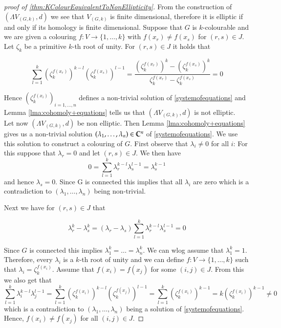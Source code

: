  
 \begin{proof}[proof of \ref{thm:KColourEquivalentToNonEllipticity}]
  From the construction of $(\Lambda V_{(G,k)},d)$ we see that  $V_{(G,k)}$ is finite dimensional, therefore
  it is elliptic if and only if its homology is finite dimensional. Suppose that $G$ is $k$-colourable and we are given a colouring
  $f \colon V \to { \lbrace 1, \dotsc , k \rbrace }$ with $f(x_r) \neq f(x_s)$ for $(r,s) \in J$. Let $\zeta_k$ be a primitive 
  $k$-th root of unity. For $(r,s) \in J$ it holds that
  
  $$ \sum_{l = 1}^k (\zeta_k^{f(x_r)})^{k-l} (\zeta_k^{f(x_s)})^{l-1}
  = \frac{(\zeta_k^{f(x_r)})^{k} - (\zeta_k^{f(x_s)})^{k}}{ \zeta_k^{f(x_r)} - \zeta_k^{f(x_s)}} = 0
  $$
  
  Hence $(\zeta_k^{f(x_i)})_{i = 1, \dotsc, n}$ defines a non-trivial solution of \ref{systemofequations}
  and Lemma \ref{lma:cohomoly+equations} tells us that $(\Lambda V_{(G,k)},d)$ is not elliptic. \\
  Let now $(\Lambda V_{(G,k)},d)$ be non elliptic. Then Lemma \ref{lma:cohomoly+equations} gives us a non-trivial
  solution $(\lambda_1 , \dotsc, \lambda_n) \in \mathbb{C}^n$ of \ref{systemofequations}. We use this solution to construct
  a colouring of $G$. 
  First observe that $\lambda_i \neq 0$ for all $i$: For this suppose that $\lambda_r = 0$ and let $(r,s) \in J$.
  We then have 
  $$0 =\sum_{l = 1}^k \lambda_r^{k -l} \lambda_s^{l - 1} = \lambda_s^{k-1}$$
  and hence $\lambda_s = 0$. Since G is connected this implies that all $\lambda_i$ are zero which is a
  contradiction to $(\lambda_1, \ldots, \lambda_n)$ being non-trivial.
  
  Next we have
  for $(r,s) \in J$ that
  
  $$ \lambda_r^k - \lambda_s^k = ( \lambda_r - \lambda_s) 
  \sum_{l = 1}^k \lambda_r^{k - l} \lambda_s^{l - 1} = 0$$
  
  Since $G$ is connected this implies
  $\lambda_1^k = \dotsc = \lambda_n^k$.  We can wlog assume that  $\lambda_1^k = 1$. Therefore, every $\lambda_i$ is a 
  $k$-th root of unity and we can define $f \colon V \to { \lbrace 1, \dotsc , k \rbrace }$ such that 
  $\lambda_i = \zeta_k^{f(x_i)}$.
  Assume that $f(x_i) = f(x_j)$ for some $(i,j) \in J$.
  From this we also get that 
  $$\sum_{l = 1}^k \lambda_i^{k - l} \lambda_j^{l - 1} = \sum_{l = 1}^k (\zeta_k^{f(x_i)})^{k-l} (\zeta_k^{f(x_j)})^{l-1}
  = \sum_{l = 1}^k (\zeta_k^{f(x_i)})^{k-1} = k (\zeta_k^{f(x_i)})^{k-1} \neq 0$$ 
  which is a contradiction to $(\lambda_1 , \dotsc, \lambda_n)$ being a solution of \ref{systemofequations}. Hence,
  $f(x_i) \neq f(x_j)$ for all $(i,j) \in J$.
  
 \end{proof}

